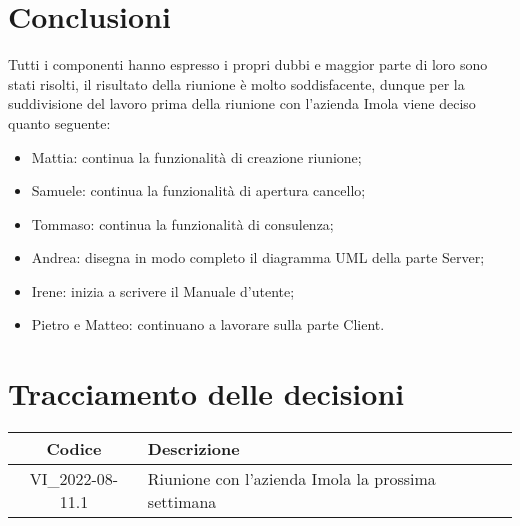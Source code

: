\section{Conclusioni}
	Tutti i componenti hanno espresso i propri dubbi e maggior parte di loro sono stati risolti, il risultato della riunione è molto soddisfacente, dunque per la suddivisione del lavoro prima della riunione con l'azienda Imola viene deciso quanto seguente:
	\begin{itemize}
	\item Mattia: continua la funzionalità di creazione riunione;
	\item Samuele: continua la funzionalità di apertura cancello;
	\item Tommaso: continua la funzionalità di consulenza;
	\item Andrea: disegna in modo completo il diagramma UML della parte Server;
	\item Irene: inizia a scrivere il Manuale d'utente;
	\item Pietro e Matteo: continuano a lavorare sulla parte Client.
	\end{itemize}

\newpage

\section*{Tracciamento delle decisioni}
	\renewcommand{\arraystretch}{1.8} %
	\begin{tabular}{ |c|l| }
		\hline
		\textbf{Codice} & \textbf{Descrizione} \\
		\hline
		VI\_2022-08-11.1 & Riunione con l'azienda Imola la prossima settimana\\ %
		\hline
	\end{tabular}